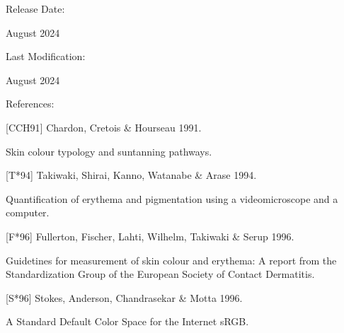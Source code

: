 \documentclass[letterpaper,10pt,english]{sphinxmanual}
\begin{document}
\begin{DUlineblock}{0em}
\item[] Release Date:
\item[] August 2024
\item[] Last Modification:
\item[] August 2024
\end{DUlineblock}

\begin{DUlineblock}{0em}
\item[] References:
\end{DUlineblock}

\begin{DUlineblock}{0em}
\item[] {[}CCH91{]} Chardon, Cretois \& Hourseau 1991.
\item[] Skin colour typology and suntanning pathways.
\item[] 
\end{DUlineblock}

\begin{DUlineblock}{0em}
\item[] {[}T*94{]} Takiwaki, Shirai, Kanno, Watanabe \& Arase 1994.
\item[] Quantification of erythema and pigmentation using a videomicroscope and a computer.
\item[] 
\end{DUlineblock}

\begin{DUlineblock}{0em}
\item[] {[}F*96{]} Fullerton, Fischer, Lahti, Wilhelm, Takiwaki \& Serup 1996.
\item[] Guidetines for measurement of skin colour and erythema: A report from the Standardization Group of the European Society of Contact Dermatitis.
\item[] 
\end{DUlineblock}

\begin{DUlineblock}{0em}
\item[] {[}S*96{]} Stokes, Anderson, Chandrasekar \& Motta 1996.
\item[] A Standard Default Color Space for the Internet \sphinxhyphen{} sRGB.
\item[] 
\end{DUlineblock}
\end{document}
